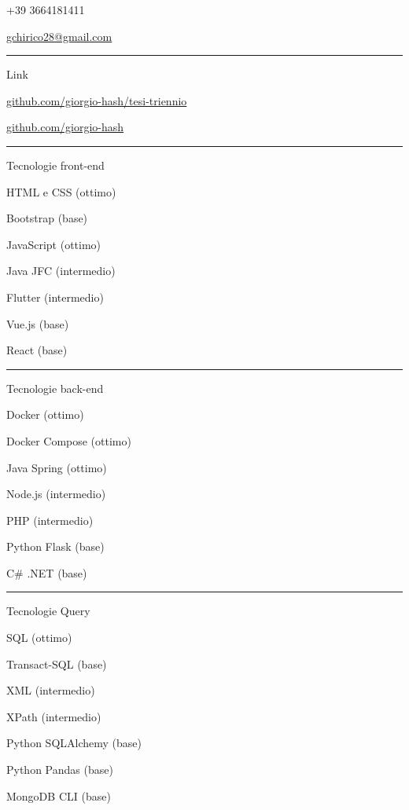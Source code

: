 \documentclass[a4paper]{letter}
\begin{document}
\begin{minipage}[t]{0.30\textwidth}
\faPhone \quad +39 3664181411

\faEnvelope \quad \href{mailto://gchirico28@gmail.com}{gchirico28@gmail.com}

\rule{\linewidth}{0.4pt}

{\large Link}

\faGithub \quad \href{https://github.com/giorgio-hash/tesi-triennio}{github.com/giorgio-hash/tesi-triennio}

\faGithub \quad \href{https://github.com/giorgio-hash}{github.com/giorgio-hash}

\rule{\linewidth}{0.4pt}

{\large Tecnologie front-end}

\faCode \quad HTML e CSS (ottimo)

\faCode \quad Bootstrap (base)

\faCode \quad JavaScript (ottimo)

\faCode \quad Java JFC (intermedio)

\faCode \quad Flutter (intermedio)

\faCode \quad Vue.js (base)

\faCode \quad React (base)



\rule{\linewidth}{0.4pt}

{\large Tecnologie back-end}

\faCode \quad Docker (ottimo)

\faCode \quad Docker Compose (ottimo)

\faCode \quad Java Spring (ottimo)

\faCode \quad Node.js (intermedio)

\faCode \quad PHP (intermedio)

\faCode \quad Python Flask (base)

\faCode \quad C\# .NET (base)

\rule{\linewidth}{0.4pt}


{\large Tecnologie Query}

\faCode \quad SQL (ottimo)

\faCode \quad Transact-SQL (base)

\faCode \quad XML (intermedio)

\faCode \quad XPath (intermedio)

\faCode \quad Python SQLAlchemy (base)

\faCode \quad Python Pandas (base)

\faCode \quad MongoDB CLI (base)



\end{minipage}
\end{document}
